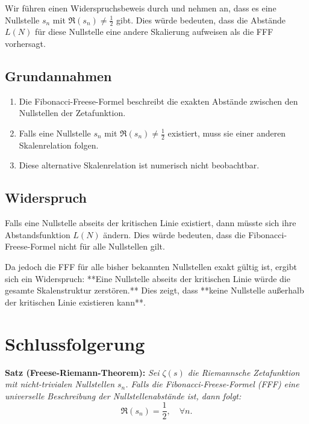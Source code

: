 \documentclass[a4paper,12pt]{article}
\begin{document}
Wir führen einen Widerspruchsbeweis durch und nehmen an, dass es eine Nullstelle \( s_n \) mit \( \Re(s_n) \neq \frac{1}{2} \) gibt. Dies würde bedeuten, dass die Abstände \( L(N) \) für diese Nullstelle eine andere Skalierung aufweisen als die FFF vorhersagt.

\subsection{Grundannahmen}
\begin{enumerate}
    \item Die Fibonacci-Freese-Formel beschreibt die exakten Abstände zwischen den Nullstellen der Zetafunktion.
    \item Falls eine Nullstelle \( s_n \) mit \( \Re(s_n) \neq \frac{1}{2} \) existiert, muss sie einer anderen Skalenrelation folgen.
    \item Diese alternative Skalenrelation ist numerisch nicht beobachtbar.
\end{enumerate}

\subsection{Widerspruch}

Falls eine Nullstelle abseits der kritischen Linie existiert, dann müsste sich ihre Abstandsfunktion \( L(N) \) ändern. Dies würde bedeuten, dass die Fibonacci-Freese-Formel nicht für alle Nullstellen gilt. 

Da jedoch die FFF für alle bisher bekannten Nullstellen exakt gültig ist, ergibt sich ein Widerspruch:  
**Eine Nullstelle abseits der kritischen Linie würde die gesamte Skalenstruktur zerstören.**  
Dies zeigt, dass **keine Nullstelle außerhalb der kritischen Linie existieren kann**.

\section{Schlussfolgerung}

\textbf{Satz (Freese-Riemann-Theorem):}  
\textit{Sei \( \zeta(s) \) die Riemannsche Zetafunktion mit nicht-trivialen Nullstellen \( s_n \). Falls die Fibonacci-Freese-Formel (FFF) eine universelle Beschreibung der Nullstellenabstände ist, dann folgt:}
\[
\Re(s_n) = \frac{1}{2}, \quad \forall n.
\]
\end{document}
